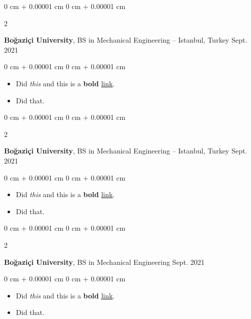 \documentclass[10pt, letterpaper]{article}
\newenvironment{highlights}{
    \begin{itemize}[
        topsep=0.10 cm,
        parsep=0.10 cm,
        partopsep=0pt,
        itemsep=0pt,
        leftmargin=0 cm + 10pt
    ]
}{
    \end{itemize}
} %
\newenvironment{onecolentry}{
    \begin{adjustwidth}{
        0 cm + 0.00001 cm
    }{
        0 cm + 0.00001 cm
    }
}{
    \end{adjustwidth}
} %
\newenvironment{twocolentry}[2][]{
    \onecolentry
    \def\secondColumn{#2}
    \setcolumnwidth{\fill, 4.5 cm}
    \begin{paracol}{2}
}{
    \switchcolumn \raggedleft \secondColumn
    \end{paracol}
    \endonecolentry
} %
\begin{document}
        \vspace{0.2 cm}

        \begin{twocolentry}{
            Sept. 2021
        }
            \textbf{Boğaziçi University}, BS in Mechanical Engineering -- Istanbul, Turkey\end{twocolentry}

        \vspace{0.10 cm}
        \begin{onecolentry}
            \begin{highlights}
                \item Did \textit{this} and this is a \textbf{bold} \href{https://example.com}{link}.
                \item Did that.
            \end{highlights}
        \end{onecolentry}


        \vspace{0.2 cm}

        \begin{twocolentry}{
            Sept. 2021
        }
            \textbf{Boğaziçi University}, BS in Mechanical Engineering -- Istanbul, Turkey\end{twocolentry}

        \vspace{0.10 cm}
        \begin{onecolentry}
            \begin{highlights}
                \item Did \textit{this} and this is a \textbf{bold} \href{https://example.com}{link}.
                \item Did that.
            \end{highlights}
        \end{onecolentry}


        \vspace{0.2 cm}

        \begin{twocolentry}{
            Sept. 2021
        }
            \textbf{Boğaziçi University}, BS in Mechanical Engineering\end{twocolentry}

        \vspace{0.10 cm}
        \begin{onecolentry}
            \begin{highlights}
                \item Did \textit{this} and this is a \textbf{bold} \href{https://example.com}{link}.
                \item Did that.
            \end{highlights}
        \end{onecolentry}
\end{document}
